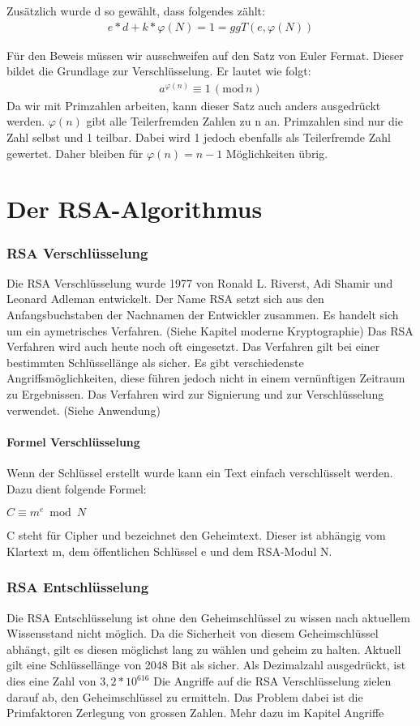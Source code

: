 Zusätzlich wurde d so gewählt, dass folgendes zählt:
\begin{align}
 e * d + k * \varphi(N) = 1 = ggT(e,\varphi(N))
\end{align}

Für den Beweis müssen wir ausschweifen auf den Satz von Euler Fermat. Dieser bildet die Grundlage 
zur Verschlüsselung. Er lautet wie folgt:
\begin{align}
	a^{\varphi(n)} \equiv 1\,(\mathrm{mod}\,n)
\end{align}
Da wir mit Primzahlen arbeiten, kann dieser Satz auch anders ausgedrückt werden. $ \varphi(n) $ gibt alle Teilerfremden Zahlen zu n an. Primzahlen 
sind nur die Zahl selbst und 1 teilbar. Dabei wird 1 jedoch ebenfalls als Teilerfremde Zahl gewertet. Daher bleiben für $ \varphi(n) = n-1 $ Möglichkeiten übrig.
\part{Der RSA-Algorithmus}



\section{RSA Verschlüsselung}
Die RSA Verschlüsselung wurde 1977 von Ronald L. Riverst, Adi Shamir und Leonard Adleman entwickelt. Der Name RSA setzt sich aus den Anfangsbuchstaben der Nachnamen der Entwickler zusammen. Es handelt sich um ein aymetrisches Verfahren. (Siehe Kapitel moderne Kryptographie) %
Das RSA Verfahren wird auch heute noch oft eingesetzt. Das Verfahren gilt bei einer bestimmten Schlüssellänge als sicher. Es gibt verschiedenste Angriffsmöglichkeiten, diese führen jedoch nicht in einem vernünftigen Zeitraum zu Ergebnissen. Das Verfahren wird zur Signierung und zur Verschlüsselung verwendet. (Siehe Anwendung) %

\subsection{Formel Verschlüsselung}
Wenn der Schlüssel erstellt wurde kann ein Text einfach verschlüsselt werden. Dazu dient folgende Formel:

$ C \equiv m^e  \bmod N $

C steht für Cipher und bezeichnet den Geheimtext. Dieser ist abhängig vom Klartext m, dem öffentlichen Schlüssel e und dem RSA-Modul N. 

\section{RSA Entschlüsselung}
Die RSA Entschlüsselung ist ohne den Geheimschlüssel zu wissen nach aktuellem Wissensstand nicht möglich. Da die Sicherheit von diesem Geheimschlüssel abhängt, gilt es diesen möglichst lang zu wählen und geheim zu halten. Aktuell gilt eine Schlüssellänge von 2048 Bit als sicher. Als Dezimalzahl ausgedrückt, ist dies eine Zahl von $ 3,2 * 10^{616} $
Die Angriffe auf die RSA Verschlüsselung zielen darauf ab, den Geheimschlüssel zu ermitteln. Das Problem dabei ist die Primfaktoren Zerlegung von grossen Zahlen. Mehr dazu im Kapitel Angriffe %


